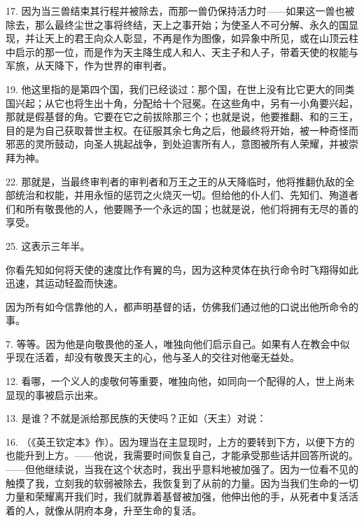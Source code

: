 17.  因为当三兽结束其行程并被除去，而那一兽仍保持活力时——如果这一兽也被除去，那么最终尘世之事将终结，天上之事开始；为使圣人不可分解、永久的国显现，并让天上的君王向众人彰显，不再是作为图像，如异象中所见，或在山顶云柱中启示的那一位，而是作为天主降生成人和人、天主子和人子，带着天使的权能与军旅，从天降下，作为世界的审判者。\par

19.  他这里指的是第四个国，我们已经谈过：那个国，在世上没有比它更大的同类国兴起；从它也将生出十角，分配给十个冠冕。在这些角中，另有一小角要兴起，那就是假基督的角。它要在它之前拔除那三个；也就是说，他要推翻、和的三王，目的是为自己获取普世主权。在征服其余七角之后，他最终将开始，被一种奇怪而邪恶的灵所鼓动，向圣人挑起战争，到处迫害所有人，意图被所有人荣耀，并被崇拜为神。\par

22.  那就是，当最终审判者的审判者和万王之王的从天降临时，他将推翻仇敌的全部统治和权能，并用永恒的惩罚之火烧灭一切。但给他的仆人们、先知们、殉道者们和所有敬畏他的人，他要赐予一个永远的国；也就是说，他们将拥有无尽的善的享受。\par

25.  这表示三年半。\par

  你看先知如何将天使的速度比作有翼的鸟，因为这种灵体在执行命令时飞翔得如此迅速，其运动轻盈而快速。\par

  因为所有如今信靠他的人，都声明基督的话，仿佛我们通过他的口说出他所命令的事。\par

7.  等等。因为他是向敬畏他的圣人，唯独向他们启示自己。如果有人在教会中似乎现在活着，却没有敬畏天主的心，他与圣人的交往对他毫无益处。\par

12.  看哪，一个义人的虔敬何等重要，唯独向他，如同向一个配得的人，世上尚未显现的事被启示出来。\par

13.  是谁？不就是派给那民族的天使吗？正如（天主）对说：\par

16. （《英王钦定本》作）。因为理当在主显现时，上方的要转到下方，以便下方的也能升到上方。——他说，我需要时间恢复自己，才能承受那些话并回答所说的。——但他继续说，当我在这个状态时，我出乎意料地被加强了。因为一位看不见的触摸了我，立刻我的软弱被除去，我恢复到了从前的力量。因为当我们生命的一切力量和荣耀离开我们时，我们就靠着基督被加强，他伸出他的手，从死者中复活活着的人，就像从阴府本身，升至生命的复活。\par

